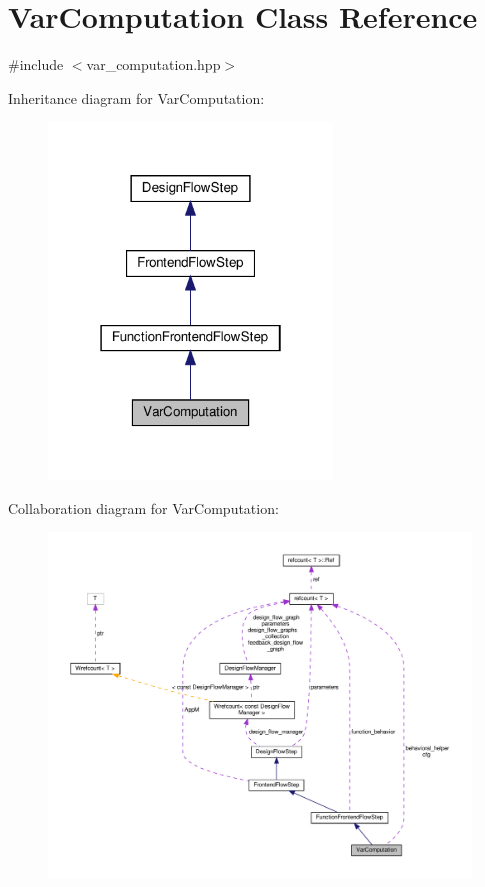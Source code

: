 \hypertarget{classVarComputation}{}\section{Var\+Computation Class Reference}
\label{classVarComputation}


{\ttfamily \#include $<$var\+\_\+computation.\+hpp$>$}



Inheritance diagram for Var\+Computation\+:
\nopagebreak
\begin{figure}[H]
\begin{center}
\leavevmode
\includegraphics[width=214pt]{d2/de9/classVarComputation__inherit__graph}
\end{center}
\end{figure}


Collaboration diagram for Var\+Computation\+:
\nopagebreak
\begin{figure}[H]
\begin{center}
\leavevmode
\includegraphics[width=350pt]{df/d71/classVarComputation__coll__graph}
\end{center}
\end{figure}
